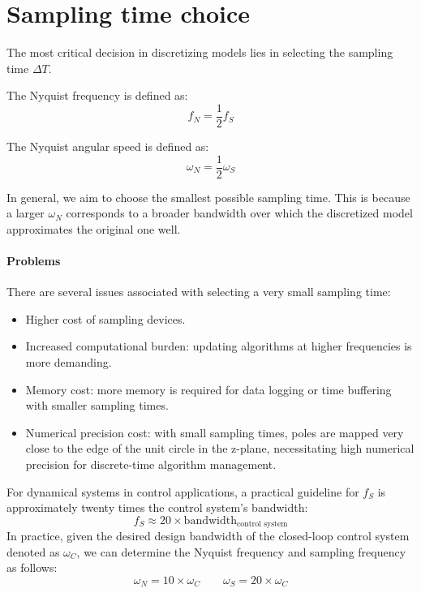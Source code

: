 \section{Sampling time choice}

The most critical decision in discretizing models lies in selecting the sampling time $\Delta T$. 
\begin{definition}
    The Nyquist frequency is defined as:
    \[f_N=\dfrac{1}{2}f_S\]
\end{definition}
\begin{definition}
    The Nyquist angular speed is defined as:
    \[\omega_N=\dfrac{1}{2}\omega_S\]
\end{definition}
In general, we aim to choose the smallest possible sampling time. 
This is because a larger $\omega_N$ corresponds to a broader bandwidth over which the discretized model approximates the original one well.

\paragraph*{Problems}
There are several issues associated with selecting a very small sampling time:
\begin{itemize}
    \item Higher cost of sampling devices.
    \item Increased computational burden: updating algorithms at higher frequencies is more demanding.
    \item Memory cost: more memory is required for data logging or time buffering with smaller sampling times.
    \item Numerical precision cost: with small sampling times, poles are mapped very close to the edge of the unit circle in the z-plane, necessitating high numerical precision for discrete-time algorithm management.
\end{itemize}
For dynamical systems in control applications, a practical guideline for $f_S$ is approximately twenty times the control system's bandwidth:
\[f_S \approx 20 \times \text{bandwidth}_{\text{control system}}\]
In practice, given the desired design bandwidth of the closed-loop control system denoted as $\omega_C$, we can determine the Nyquist frequency and sampling frequency as follows:
\[\omega_N=10 \times \omega_C \qquad \omega_S=20 \times \omega_C\]
